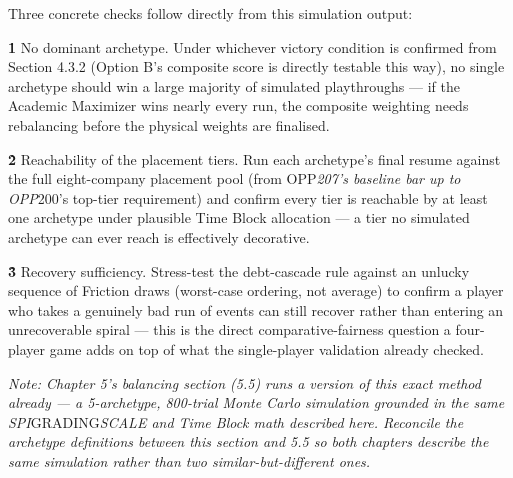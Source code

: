 Three concrete checks follow directly from this simulation output:

\textbf{1\.} No dominant archetype. Under whichever victory condition is confirmed from Section 4.3.2 (Option B's composite score is directly testable this way), no single archetype should win a large majority of simulated playthroughs --- if the Academic Maximizer wins nearly every run, the composite weighting needs rebalancing before the physical weights are finalised.

\textbf{2\.} Reachability of the placement tiers. Run each archetype's final resume against the full eight-company placement pool (from OPP\emph{207's baseline bar up to OPP}200's top-tier requirement) and confirm every tier is reachable by at least one archetype under plausible Time Block allocation --- a tier no simulated archetype can ever reach is effectively decorative.

\textbf{3\.} Recovery sufficiency. Stress-test the debt-cascade rule against an unlucky sequence of Friction draws (worst-case ordering, not average) to confirm a player who takes a genuinely bad run of events can still recover rather than entering an unrecoverable spiral --- this is the direct comparative-fairness question a four-player game adds on top of what the single-player validation already checked.

\emph{Note: Chapter 5's balancing section (5.5) runs a version of this exact method already --- a 5-archetype, 800-trial Monte Carlo simulation grounded in the same SPI}GRADING\emph{SCALE and Time Block math described here. Reconcile the archetype definitions between this section and 5.5 so both chapters describe the same simulation rather than two similar-but-different ones.}
